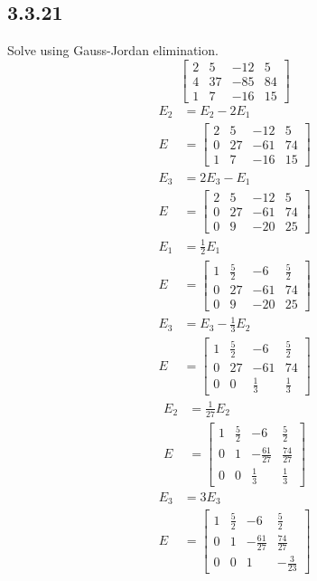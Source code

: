 \documentclass{article}
\begin{document}
\subsection{3.3.21}
Solve using Gauss-Jordan elimination.
\begin{equation*}
	\left[
		\begin{array}{ccc|c}
			2 & 5 & -12 & 5 \\
			4 & 37 & -85 & 84 \\
			1 & 7 & -16 & 15
		\end{array}
	\right]
\end{equation*}
\begin{align*}
	E_2 & = E_2 - 2E_1 \\
	E & = \left[
		\begin{array}{ccc|c}
			2 & 5 & -12 & 5 \\
			0 & 27 & -61 & 74 \\
			1 & 7 & -16 & 15
		\end{array}
	\right]
\end{align*}
\begin{align*}
	E_3 & = 2E_3 - E_1 \\
	E & = \left[
		\begin{array}{ccc|c}
			2 & 5 & -12 & 5 \\
			0 & 27 & -61 & 74 \\
			0 & 9 & -20 & 25
		\end{array}
	\right]
\end{align*}
\begin{align*}
	E_1 & = \frac{1}{2}E_1 \\
	E & = \left[
		\begin{array}{ccc|c}
			1 & \frac{5}{2} & -6 & \frac{5}{2} \\
			0 & 27 & -61 & 74 \\
			0 & 9 & -20 & 25
		\end{array}
	\right]
\end{align*}
\begin{align*}
	E_3 & = E_3 - \frac{1}{3}E_2 \\
	E & = \left[
		\begin{array}{ccc|c}
			1 & \frac{5}{2} & -6 & \frac{5}{2} \\
			0 & 27 & -61 & 74 \\
			0 & 0 & \frac{1}{3} & \frac{1}{3}
		\end{array}
	\right]
\end{align*}
\begin{align*}
	E_2 & = \frac{1}{27}E_2 \\
	E & = \left[
		\begin{array}{ccc|c}
			1 & \frac{5}{2} & -6 & \frac{5}{2} \\
			0 & 1 & -\frac{61}{27} & \frac{74}{27} \\
			0 & 0 & \frac{1}{3} & \frac{1}{3}
		\end{array}
	\right]
\end{align*}
\begin{align*}
	E_3 & = 3E_3 \\
	E & = \left[
		\begin{array}{ccc|c}
			1 & \frac{5}{2} & -6 & \frac{5}{2} \\
			0 & 1 & -\frac{61}{27} & \frac{74}{27} \\
			0 & 0 & 1 & -\frac{3}{23}
		\end{array}
	\right]
\end{align*}
\end{document}

